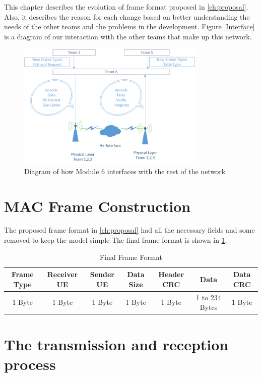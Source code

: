 This chapter describes the evolution of frame format proposed in \ref{ch:proposal}. Also, it describes the reason for each change based on better understanding the needs of the other teams and the problems in the development. Figure \ref{Interface} is a diagram of our interaction with the other teams that make up this network. 
\begin{figure}[ht]
    \centering
    \includegraphics[width=0.8\textwidth]{Interface_diagram.PNG}
    \caption{Diagram of how Module 6 interfaces with the rest of the network}
    \label{fig:Interface}
\end{figure}


\section{MAC Frame Construction}
The proposed frame format in \ref{ch:proposal} had all the necessary fields and some removed to keep the model simple
The final frame format is  shown in \ref{tab:finalFrame}.

\begin{table}
\begin{tabular}{| c | c | c | c | c | c | c | }
  \hline                       
  Frame Type & Receiver UE & Sender UE & Data Size & Header CRC & Data & Data CRC\\
  \hline
	1 Byte & 1 Byte & 1 Byte & 1 Byte & 1 Byte & 1 to 234 Bytes & 1 Byte\\
  
  \hline  
\end{tabular}
 \caption{Final Frame Format}
	\label{tab:finalFrame}
\end{table}

\section{The transmission and reception process}

